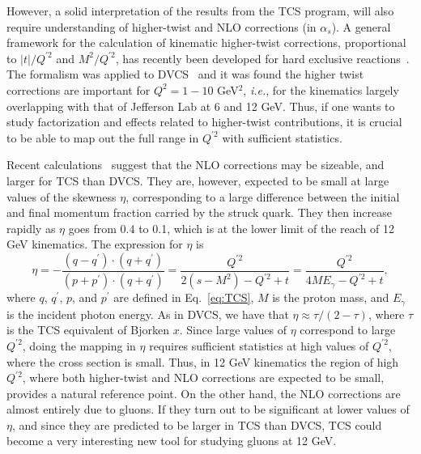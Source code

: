 However, a solid interpretation of the results from the TCS program, will also
require understanding of higher-twist and NLO corrections (in $\alpha_s$).
A general framework for the calculation of kinematic higher-twist corrections,
proportional to $|t|/Q^{\prime 2}$ and $M^2/Q^{\prime 2}$, has recently been
developed  for hard exclusive reactions~\cite{Braun:2011zr}.
The formalism was applied to DVCS~\cite{Braun:2012hq} and it was found the
higher twist corrections are important for $Q^{2}=1-10$ GeV$^2$,
\textit{i.e.}, for the kinematics largely overlapping with that of Jefferson
Lab at 6 and 12 GeV. Thus, if one wants to study factorization and effects 
related to higher-twist contributions, it is crucial to be able to map out
the full range in $Q^{\prime 2}$ with sufficient statistics.

Recent calculations~\cite{Moutarde:2013qs} suggest that the NLO corrections
may be sizeable, and larger for TCS than DVCS. They are, however, expected to
be small at large values of the skewness $\eta$, corresponding to a large
difference between the initial and final momentum fraction carried by the
struck quark. They then increase rapidly as $\eta$ goes from 0.4 to 0.1, which
is at the lower limit of the reach of 12 GeV kinematics. The expression for
$\eta$ is
\begin{equation}
\eta = - \frac{(q-q^\prime) \cdot (q+q^\prime)}{(p+p^\prime) \cdot (q+q^\prime)} = \frac{Q^{\prime 2}}{2(s - M^2) - Q^{\prime 2} + t} = \frac{Q^{\prime 2}}{4ME_\gamma - Q^{\prime 2} + t},
\label{eq:etatauQ2}
\end{equation}
where $q$, $q^\prime$, $p$, and $p^\prime$ are defined in Eq.~\ref{eq:TCS},
$M$ is the proton mass, and $E_\gamma$ is the incident photon energy.
As in DVCS, we have that $\eta \approx \tau / (2 - \tau)$, where $\tau$ is
the TCS equivalent of Bjorken $x$.
Since large values of $\eta$ correspond to large $Q^{\prime 2}$, doing the
mapping in $\eta$ requires sufficient statistics at high values of
$Q^{\prime 2}$, where the cross section is small.
Thus, in 12 GeV kinematics the region of high $Q^{\prime 2}$, where
both higher-twist and NLO corrections are expected to be small, provides a
natural reference point.
On the other hand, the NLO corrections are almost entirely due to gluons. If
they turn out to be significant at lower values of $\eta$, and since they are
predicted to be larger in TCS than DVCS, TCS could become a very interesting
new tool for studying gluons at 12 GeV.

